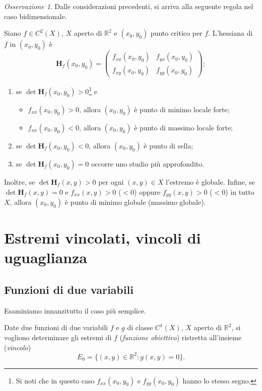 \documentclass[a4paper]{book}
\numberwithin{equation}{section}
\theoremstyle{plain}
\theoremstyle{definition}
\theoremstyle{remark}
\newtheorem{oss}{Osservazione}[section]
\theoremstyle{example}
\begin{document}
	\begin{oss} Dalle considerazioni precedenti, si arriva alla seguente regola nel caso bidimensionale.

		Siano $f \in C^2(X)$, $X$ aperto di $\mathbb{R}^2$ e $(x_0, y_0)$ punto critico per $f$. L'hessiana di $f$ in $(x_0, y_0)$ è
		\begin{equation*}
			\mathbf{H}_f(x_0, y_0) = \begin{pmatrix} f_{xx}(x_0, y_0) & f_{yx}(x_0, y_0) \\ f_{xy}(x_0, y_0) & f_{yy}(x_0, y_0) \end{pmatrix};
		\end{equation*}
		\begin{enumerate}
			\item se $\det{\mathbf{H}_f(x_0, y_0)} > 0$\footnote{Si noti che in questo caso $f_{xx}(x_0, y_0)$ e $f_{yy}(x_0, y_0)$ hanno lo stesso segno.} e
			\begin{itemize}
				\item $f_{xx}(x_0, y_0) > 0$, allora $(x_0, y_0)$ è punto di minimo locale forte;
				\item $f_{xx}(x_0, y_0) < 0$, allora $(x_0, y_0)$ è punto di massimo locale forte;
			\end{itemize}
			\item se $\det{\mathbf{H}_f(x_0, y_0)} < 0$, allora $(x_0, y_0)$ è punto di sella;
			\item se $\det{\mathbf{H}_f(x_0, y_0)} = 0$ occorre uno studio più approfondito.
		\end{enumerate}
		Inoltre, se $\det{\mathbf{H}_f(x, y)} > 0$ per ogni $(x, y) \in X$ l'estremo è globale. Infine, se $\det{\mathbf{H}_f(x, y)} = 0$ e $f_{xx}(x,y) > 0$ ($< 0$) oppure $f_{yy}(x,y) > 0$ ($< 0$) in tutto $X$, allora $(x_0, y_0)$ è punto di minimo globale (massimo globale).
	\end{oss}

	\section{Estremi vincolati, vincoli di uguaglianza}
	\subsection{Funzioni di due variabili}
	Esaminiamo innanzitutto il caso più semplice.

	Date due funzioni di due variabili $f$ e $g$ di classe $C^1(X)$, $X$ aperto di $\mathbb{R}^2$, si vogliono determinare gli estremi di $f$ (\emph{funzione obiettivo}) ristretta all'insieme (\emph{vincolo})
	\begin{equation*}
		E_0 = \{ (x, y) \in \mathbb{R}^2 \colon g(x, y) = 0 \}.
	\end{equation*}
\end{document}
